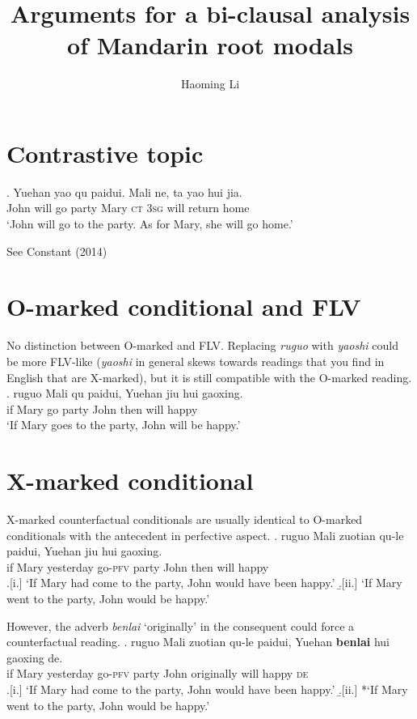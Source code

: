\documentclass[11pt]{article}
\title{Arguments for a bi-clausal analysis of Mandarin root modals}
\author{Haoming Li}
\begin{document}
\section{Contrastive topic}
\label{sec:contrastive_topic}

\ex. \gll 
Yuehan yao qu paidui. Mali ne, ta yao hui jia. \\
John will go party Mary \textsc{ct} \textsc{3sg} will return home \\
\glt `John will go to the party. As for Mary, she will go home.'

See Constant (2014)

\section{O-marked conditional and FLV}
\label{sec:o_marked_conditional}

No distinction between O-marked and FLV. Replacing \emph{ruguo} with \emph{yaoshi} could be more FLV-like (\emph{yaoshi} in general skews towards readings that you find in English that are X-marked), but it is still compatible with the O-marked reading.
\ex. \gll 
ruguo Mali qu paidui, Yuehan jiu hui gaoxing. \\
if Mary go party John then will happy \\
\glt `If Mary goes to the party, John will be happy.'

\section{X-marked conditional}
\label{sec:x_marked_conditional}

X-marked counterfactual conditionals are usually identical to O-marked conditionals with the antecedent in perfective aspect.
\ex. \gll 
ruguo Mali zuotian qu-le paidui, Yuehan jiu hui gaoxing. \\
if Mary yesterday go-\textsc{pfv} party John then will happy \\
\a.[i.] `If Mary had come to the party, John would have been happy.'
\b.[ii.] `If Mary went to the party, John would be happy.'

However, the adverb \emph{benlai} `originally' in the consequent could force a counterfactual reading.
\ex. \gll 
ruguo Mali zuotian qu-le paidui, Yuehan \textbf{benlai} hui gaoxing de. \\
if Mary yesterday go-\textsc{pfv} party John originally will happy \textsc{de}\\
\a.[i.] `If Mary had come to the party, John would have been happy.'
\b.[ii.] *`If Mary went to the party, John would be happy.'
\end{document}
